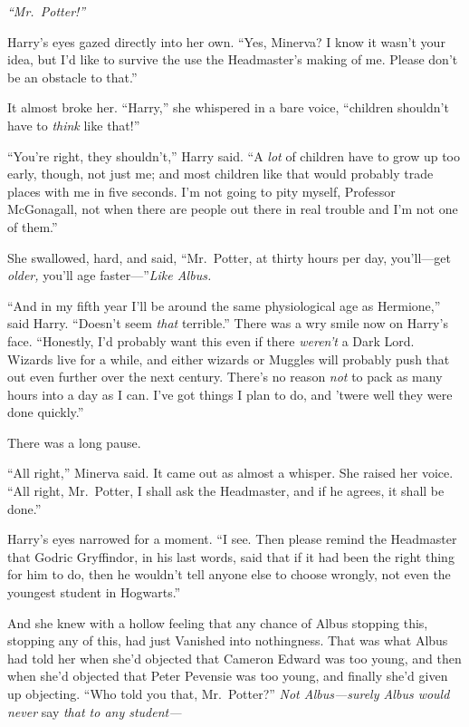 \emph{``Mr.~Potter!''}

Harry's eyes gazed directly into her own. ``Yes, Minerva? I know it
wasn't your idea, but I'd like to survive the use the Headmaster's
making of me. Please don't be an obstacle to that.''

It almost broke her. ``Harry,'' she whispered in a bare voice,
``children shouldn't have to \emph{think} like that!''

``You're right, they shouldn't,'' Harry said. ``A \emph{lot} of children
have to grow up too early, though, not just me; and most children like
that would probably trade places with me in five seconds. I'm not going
to pity myself, Professor McGonagall, not when there are people out
there in real trouble and I'm not one of them.''

She swallowed, hard, and said, ``Mr.~Potter, at thirty hours per day,
you'll---get \emph{older,} you'll age faster---''\emph{Like Albus.}

``And in my fifth year I'll be around the same physiological age as
Hermione,'' said Harry. ``Doesn't seem \emph{that} terrible.'' There was
a wry smile now on Harry's face. ``Honestly, I'd probably want this even
if there \emph{weren't} a Dark Lord. Wizards live for a while, and
either wizards or Muggles will probably push that out even further over
the next century. There's no reason \emph{not} to pack as many hours
into a day as I can. I've got things I plan to do, and 'twere well they
were done quickly.''

There was a long pause.

``All right,'' Minerva said. It came out as almost a whisper. She raised
her voice. ``All right, Mr.~Potter, I shall ask the Headmaster, and if
he agrees, it shall be done.''

Harry's eyes narrowed for a moment. ``I see. Then please remind the
Headmaster that Godric Gryffindor, in his last words, said that if it
had been the right thing for him to do, then he wouldn't tell anyone
else to choose wrongly, not even the youngest student in Hogwarts.''

And she knew with a hollow feeling that any chance of Albus stopping
this, stopping any of this, had just Vanished into nothingness. That was
what Albus had told her when she'd objected that Cameron Edward was too
young, and then when she'd objected that Peter Pevensie was too young,
and finally she'd given up objecting. ``Who told you that, Mr.~Potter?''
\emph{Not Albus---surely Albus would never} say \emph{that to any
student---}

